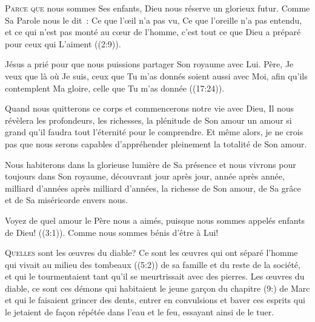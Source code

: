 \lettrine{P}{arce que} nous sommes Ses enfants,
 Dieu nous réserve un glorieux futur.
 Comme Sa Parole nous le dit~: 
 \og Ce que l'œil n'a pas vu, Ce que l'oreille n'a pas entendu,
 et ce qui n'est pas monté au cœur de l'homme,
 c'est tout ce que Dieu a préparé pour ceux qui L'aiment \fg{}
 ((2:9)). 

Jésus a prié pour que nous puissions partager Son royaume avec Lui.
 \og Père, Je veux que là où Je suis, ceux que Tu m'as donnés
 soient aussi avec Moi, afin qu'ils contemplent Ma gloire,
 celle que Tu m'as donnée \fg{} ((17:24)). 


Quand nous quitterons ce corps et commencerons notre vie avec Dieu,
 Il nous révèlera les profondeurs, les richesses, la plénitude de Son amour
 \ocadr un amour si grand qu'il faudra tout l'éternité pour le comprendre.
 Et même alors, je ne crois pas que nous serons capables d'appréhender
 pleinement la totalité de Son amour. 

Nous habiterons dans la glorieuse lumière de Sa présence et nous vivrons
 pour toujours dans Son royaume, découvrant jour après jour,
 année après année, milliard d'années après milliard d'années,
 la richesse de Son amour, de Sa grâce et de Sa miséricorde envers nous. 

\og Voyez de quel amour le Père nous a aimés, puisque nous sommes appelés
 enfants de Dieu! \fg{} ((3:1)).
 Comme nous sommes bénis d'être à Lui! 

\dvrule






\lettrine{Q}{uelles} sont les œuvres du diable?
 Ce sont les œuvres qui ont séparé l'homme qui vivait
 au milieu des tombeaux ((5:2)) de sa famille
 et du reste de la société, et qui le tourmentaient tant
 qu'il se meurtrissait avec des pierres.
 Les œuvres du diable, ce sont ces démons qui habitaient le jeune garçon
 du chapitre (9:) de Marc et qui le faisaient grincer des dents,
 entrer en convulsions et baver \ocadr ces esprits qui le jetaient
 de façon répétée dans l'eau et le feu, essayant ainsi de le tuer. 

